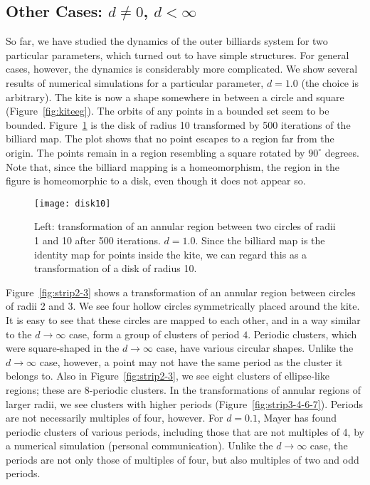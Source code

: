 \documentclass[10pt,twoside]{book}
\begin{document}
\subsection*{Other Cases: $d \neq 0$, $d < \infty$}
So far, we have studied the dynamics of the outer billiards system for two particular parameters, which turned out to have simple structures.
For general cases, however, the dynamics is considerably more complicated.
We show several results of numerical simulations for a particular parameter, $d = 1.0$ (the choice is arbitrary).
The kite is now a shape somewhere in between a circle and square (Figure~\ref{fig:kiteeg}).
The orbits of any points in a bounded set seem to be bounded.
Figure~\ref{fig:disk10} is the disk of radius 10 transformed by 500 iterations of the billiard map.
The plot shows that no point escapes to a region far from the origin.
The points remain in a region resembling a square rotated by $90^\circ$ degrees.
Note that, since the billiard mapping is a homeomorphism, the region in the figure is homeomorphic to a disk, even though it does not appear so.
\begin{figure}[ht]
  \begin{center}
    \texttt{[image: disk10]}
    \caption{Left: transformation of an annular region between two circles of radii 1 and 10 after 500 iterations.
      $d = 1.0$.
      Since the billiard map is the identity map for points inside the kite, we can regard this as a transformation of a disk of radius 10.
    }
    \label{fig:disk10}
  \end{center}
\end{figure}

Figure~\ref{fig:strip2-3} shows a transformation of an annular region between circles of radii 2 and 3.
We see four hollow circles symmetrically placed around the kite.
It is easy to see that these circles are mapped to each other, and in a way similar to the $d \to \infty$ case, form a group of clusters of period $4$.
Periodic clusters, which were square-shaped in the $d \to \infty$ case, have various circular shapes.
Unlike the $d \to \infty$ case, however, a point may not have the same period as the cluster it belongs to.
Also in Figure~\ref{fig:strip2-3}, we see eight clusters of ellipse-like regions; these are 8-periodic clusters.
In the transformations of annular regions of larger radii, we see clusters with higher periods (Figure~\ref{fig:strip3-4-6-7}).
Periods are not necessarily multiples of four, however.
For $d = 0.1$, Mayer has found periodic clusters of various periods, including those that are not multiples of 4, by a numerical simulation (personal communication).
Unlike the $d \to \infty$ case, the periods are not only those of multiples of four, but also multiples of two and odd periods.
\end{document}
